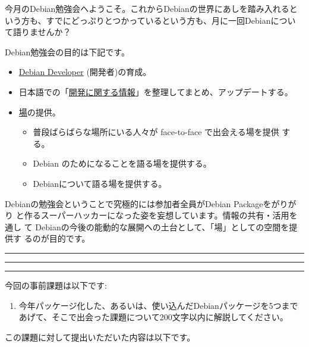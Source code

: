 \documentclass[mingoth,a4paper]{jsarticle}
\begin{document}
\begin{multicols}{2}
 

 今月のDebian勉強会へようこそ。これからDebianの世界にあしを踏み入れると
 いう方も、すでにどっぷりとつかっているという方も、月に一回Debianについ
 て語りませんか？

 Debian勉強会の目的は下記です。

 \begin{itemize}
 \item \underline{Debian Developer} (開発者)の育成。
 \item 日本語での「\underline{開発に関する情報}」を整理してまとめ、アップデートする。
 \item \underline{場}の提供。
 \begin{itemize}
  \item 普段ばらばらな場所にいる人々が face-to-face で出会える場を提供
	する。
  \item Debian のためになることを語る場を提供する。
  \item Debianについて語る場を提供する。
 \end{itemize}
 \end{itemize}		

 Debianの勉強会ということで究極的には参加者全員がDebian Packageをがりがり
 と作るスーパーハッカーになった姿を妄想しています。情報の共有・活用を通し
 て Debianの今後の能動的な展開への土台として、「場」としての空間を提供す
 るのが目的です。

\end{multicols}

\newpage

\begin{minipage}[b]{0.2\hsize}
 \colorbox{titleback}{}
\end{minipage}
\begin{minipage}[b]{0.8\hsize}
\hrule
\vspace{2mm}
\hrule
\begin{multicols}{2}
\tableofcontents
\end{multicols}
\vspace{2mm}
\hrule
\end{minipage}


今回の事前課題は以下です:
\begin{enumerate}
 \item 今年パッケージ化した、あるいは、使い込んだDebianパッケージを5つまであげて、そこで出会った課題について200文字以内に解説してください。
\end{enumerate}
この課題に対して提出いただいた内容は以下です。
\begin{multicols}{2}
{\small

}
\end{multicols}
\end{document}
